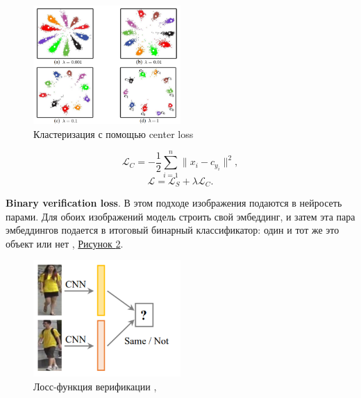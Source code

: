  \begin{figure}[ht]
     \centering
     \includegraphics[width=0.5\textwidth]{images/closed_world/center_loss.png}
     \caption{Кластеризация с помощью center loss \cite{wen2016discriminative}}
     \label{fig:center_loss}
 \end{figure}

 \begin{equation}
     \mathcal L_{C} = - \frac{1}{2}\sum \limits_{i = 1}^n  \| x_i - c_{y_i} \|^2,
 \end{equation}
 \begin{equation}
     \mathcal L = \mathcal L_S + \lambda \mathcal L_C.
 \end{equation}

 \textbf{Binary verification loss}. В этом подходе изображения подаются в нейросеть парами. Для обоих изображений модель строить свой эмбеддинг, и затем эта пара эмбеддингов подается в итоговый бинарный классификатор: один и тот же это объект или нет \cite{li2014deepreid}, \hyperref[fig:binary_verification_loss]{Рисунок \ref*{fig:binary_verification_loss}}.

 \begin{figure}[ht]
     \centering
     \includegraphics[width=0.5\textwidth]{images/closed_world/binary_verification_loss.png}
     \caption{Лосс-функция верификации \cite{li2014deepreid}, \cite{ye2021deep}}
     \label{fig:binary_verification_loss}
 \end{figure}


